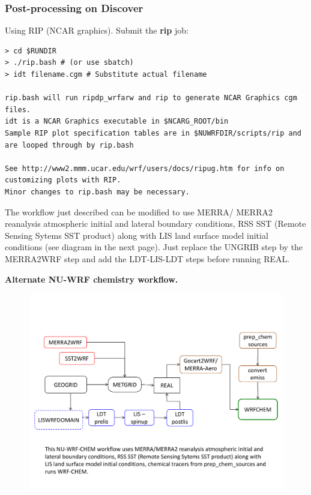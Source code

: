 \begin{frame}[fragile]
\frametitle{Post-processing on Discover}

Using RIP (NCAR graphics). Submit the \textbf{rip} job:
\begin{lstlisting}
> cd $RUNDIR
> ./rip.bash # (or use sbatch)
> idt filename.cgm # Substitute actual filename

rip.bash will run ripdp_wrfarw and rip to generate NCAR Graphics cgm files.
idt is a NCAR Graphics executable in $NCARG_ROOT/bin
Sample RIP plot specification tables are in $NUWRFDIR/scripts/rip and are looped through by rip.bash

See http://www2.mmm.ucar.edu/wrf/users/docs/ripug.htm for info on customizing plots with RIP. 
Minor changes to rip.bash may be necessary.
\end{lstlisting}

\end{frame}

\begin{frame}

The workflow just described can be modified  to use MERRA/ MERRA2 reanalysis atmospheric initial and lateral boundary conditions, RSS SST (Remote Sensing Sytems SST product) along with LIS land surface model initial conditions (see diagram in the next page). Just replace the UNGRIB step by the MERRA2WRF step and add the LDT-LIS-LDT steps before running REAL.

\end{frame}

\begin{frame}

\centering
\textbf{Alternate NU-WRF chemistry workflow.}
\begin{figure}[h]
\centering
\includegraphics[scale=.38]{chemistry-workflow-2.pdf}
\end{figure}

\end{frame}

